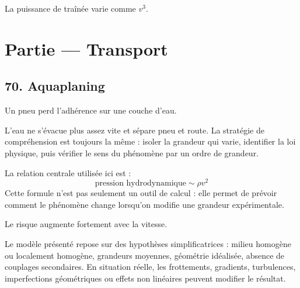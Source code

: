 \documentclass[11pt,a4paper]{article}
\begin{document}
\begin{corrigebox}[Indication]
La puissance de traînée varie comme $v^3$.
\end{corrigebox}


\section{Partie — Transport}


\subsection{70. Aquaplaning}

\begin{exemplebox}
Un pneu perd l'adhérence sur une couche d'eau.
\end{exemplebox}

\begin{methodebox}
L'eau ne s'évacue plus assez vite et sépare pneu et route.
La stratégie de compréhension est toujours la même : isoler la grandeur qui varie, identifier la loi physique, puis vérifier le sens du phénomène par un ordre de grandeur.
\end{methodebox}

\begin{theorembox}
La relation centrale utilisée ici est :
\[
\text{pression hydrodynamique}\sim\rho v^2
\]
Cette formule n'est pas seulement un outil de calcul : elle permet de prévoir comment le phénomène change lorsqu'on modifie une grandeur expérimentale.
\end{theorembox}

\begin{odgbox}
Le risque augmente fortement avec la vitesse.
\end{odgbox}

\begin{attentionbox}
Le modèle présenté repose sur des hypothèses simplificatrices : milieu homogène ou localement homogène, grandeurs moyennes, géométrie idéalisée, absence de couplages secondaires. En situation réelle, les frottements, gradients, turbulences, imperfections géométriques ou effets non linéaires peuvent modifier le résultat.
\end{attentionbox}
\end{document}
